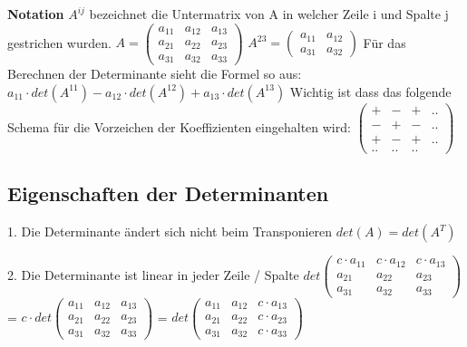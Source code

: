 \documentclass[11pt,a4paper,onecolumn]{article}
\begin{document}
\begin{flushleft}
\textbf{Notation}\linebreak
$A^{ij} $ bezeichnet die Untermatrix von A in welcher Zeile i und Spalte j gestrichen wurden.\linebreak
$A = \begin{pmatrix}
a_{11} & a_{12} & a_{13} \\
a_{21} & a_{22} & a_{23} \\
a_{31} & a_{32} & a_{33} 
\end{pmatrix} 
$
$
A^{23} = \begin{pmatrix}
a_{11} & a_{12} \\
a_{31} & a_{32} 
\end{pmatrix}
$\linebreak
Für das Berechnen der Determinante sieht die Formel so aus: \linebreak
$a_{11} \cdot det(A^{11}) - a_{12} \cdot det(A^{12}) + a_{13} \cdot det(A^{13})$\linebreak
\linebreak
Wichtig ist dass das folgende Schema für die Vorzeichen der Koeffizienten eingehalten wird: \linebreak
$\begin{pmatrix}
+ & - & + & .. \\
- & + & - & ..\\
+ & - & + & .. \\
.. & .. &.. & 
\end{pmatrix}
$
\subsection{Eigenschaften der Determinanten}
1. Die Determinante ändert sich nicht beim Transponieren\linebreak
$det(A) = det(A^{T})$\linebreak

2. Die Determinante ist linear in jeder Zeile / Spalte \linebreak
$det \begin{pmatrix}
c \cdot a_{11} & c \cdot a_{12} & c \cdot a_{13} \\
a_{21} & a_{22} & a_{23} \\
a_{31} & a_{32} & a_{33} 
\end{pmatrix} 
$ = $
c \cdot det \begin{pmatrix}
a_{11} & a_{12} & a_{13} \\
a_{21} & a_{22} & a_{23} \\
a_{31} & a_{32} & a_{33} 
\end{pmatrix} 
$ = $
det \begin{pmatrix}
a_{11} & a_{12} & c \cdot a_{13} \\
a_{21} & a_{22} & c \cdot a_{23} \\
a_{31} & a_{32} & c \cdot a_{33} 
\end{pmatrix} 
$ \linebreak


\end{flushleft}
\end{document}
